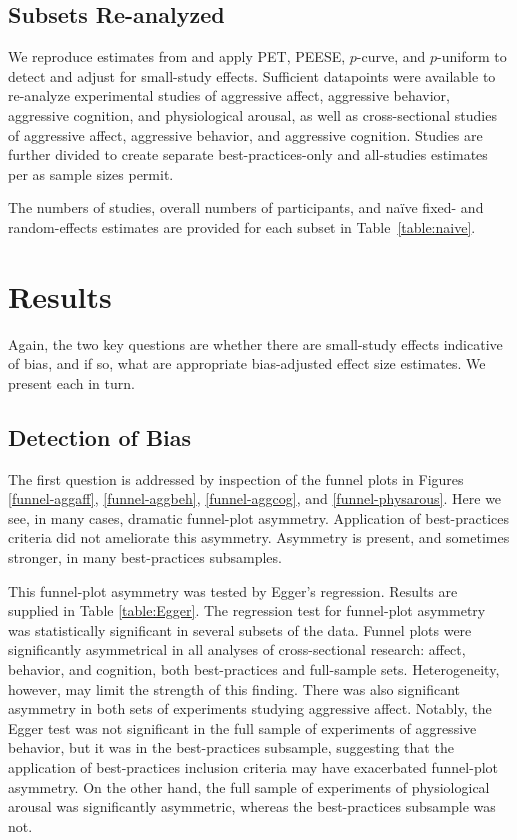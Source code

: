 \documentclass[man, mask]{apa6}
\begin{document}
\subsection{Subsets Re-analyzed}
We reproduce estimates from \citet{Anderson:etal:2010} and apply PET, PEESE, $p$-curve, and $p$-uniform to detect and adjust for small-study effects. Sufficient datapoints were available to re-analyze experimental studies of aggressive affect, aggressive behavior, aggressive cognition, and physiological arousal, as well as cross-sectional studies of aggressive affect, aggressive behavior, and aggressive cognition. Studies are further divided to create separate best-practices-only and all-studies estimates per \citet{Anderson:etal:2010} as sample sizes permit. 

The numbers of studies, overall numbers of participants, and na{\"i}ve fixed- and random-effects estimates are provided for each subset in Table~\ref{table:naive}.

\section{Results}
Again, the two key questions are whether there are small-study effects indicative of bias, and if so, what are appropriate bias-adjusted effect size estimates. We present each in turn.  

\subsection{Detection of Bias}
The first question is addressed by inspection of the funnel plots in Figures \ref{funnel-aggaff}, \ref{funnel-aggbeh}, \ref{funnel-aggcog}, and \ref{funnel-physarous}.  Here we see, in many cases, dramatic funnel-plot asymmetry. Application of best-practices criteria did not ameliorate this asymmetry. Asymmetry is present, and sometimes stronger, in many best-practices subsamples.

This funnel-plot asymmetry was tested by Egger's regression. Results are supplied in Table \ref{table:Egger}. 
The regression test for funnel-plot asymmetry was statistically significant in several subsets of the data. Funnel plots were significantly asymmetrical in all analyses of cross-sectional research: affect, behavior, and cognition, both best-practices and full-sample sets. Heterogeneity, however, may limit the strength of this finding. There was also significant asymmetry in both sets of experiments studying aggressive affect.
Notably, the Egger test was not significant in the full sample of experiments of aggressive behavior, but it was in the best-practices subsample, suggesting that the application of best-practices inclusion criteria may have exacerbated funnel-plot asymmetry. On the other hand, the full sample of experiments of physiological arousal was significantly asymmetric, whereas the best-practices subsample was not.
\end{document}
